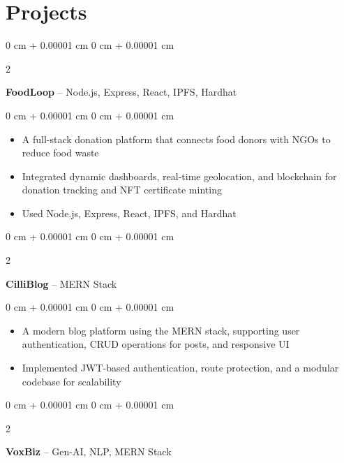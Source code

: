 \documentclass[10pt, letterpaper]{article}
\newenvironment{highlights}{
    \begin{itemize}[
        topsep=0.10 cm,
        parsep=0.10 cm,
        partopsep=0pt,
        itemsep=0pt,
        leftmargin=0 cm + 10pt
    ]
}{
    \end{itemize}
} %
\newenvironment{onecolentry}{
    \begin{adjustwidth}{
        0 cm + 0.00001 cm
    }{
        0 cm + 0.00001 cm
    }
}{
    \end{adjustwidth}
} %
\newenvironment{twocolentry}[2][]{
    \onecolentry
    \def\secondColumn{#2}
    \setcolumnwidth{\fill, 4.5 cm}
    \begin{paracol}{2}
}{
    \switchcolumn \raggedleft \secondColumn
    \end{paracol}
    \endonecolentry
} %
\begin{document}
    \section{Projects}

        \begin{twocolentry}{
            \href{https://github.com/ritheshan/FoodLoop}{\faGithub}
        }
            \textbf{FoodLoop} -- Node.js, Express, React, IPFS, Hardhat\end{twocolentry}

        \vspace{0.10 cm}
        \begin{onecolentry}
            \begin{highlights}
                \item A full-stack donation platform that connects food donors with NGOs to reduce food waste
                \item Integrated dynamic dashboards, real-time geolocation, and blockchain for donation tracking and NFT certificate minting
                \item Used Node.js, Express, React, IPFS, and Hardhat
            \end{highlights}
        \end{onecolentry}

        \vspace{0.2 cm}

        \begin{twocolentry}{
            \href{https://github.com/ritheshan/blog-app}{\faGithub}
        }
            \textbf{CilliBlog} -- MERN Stack\end{twocolentry}

        \vspace{0.10 cm}
        \begin{onecolentry}
            \begin{highlights}
                \item A modern blog platform using the MERN stack, supporting user authentication, CRUD operations for posts, and responsive UI
                \item Implemented JWT-based authentication, route protection, and a modular codebase for scalability
            \end{highlights}
        \end{onecolentry}

        \vspace{0.2 cm}

        \begin{twocolentry}{
            \href{https://github.com/ritheshan/VoxBiz}{\faGithub}
        }
            \textbf{VoxBiz} -- Gen-AI, NLP, MERN Stack\end{twocolentry}
\end{document}
